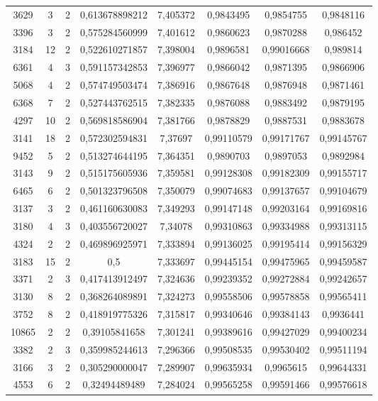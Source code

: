 \begin{longtable}{|c|c|c|c|c|c|c|c|}
3629 & 3 & 2 & 0,613678898212 & 7,405372 & 0,9843495 & 0,9854755 & 0,9848116 \\
3396 & 3 & 2 & 0,575284560999 & 7,401612 & 0,9860623 & 0,9870288 & 0,986452 \\
3184 & 12 & 2 & 0,522610271857 & 7,398004 & 0,9896581 & 0,99016668 & 0,989814 \\
6361 & 4 & 3 & 0,591157342853 & 7,396977 & 0,9866042 & 0,9871395 & 0,9866906 \\
5068 & 4 & 2 & 0,574749503474 & 7,386916 & 0,9867648 & 0,9876948 & 0,9871461 \\
6368 & 7 & 2 & 0,527443762515 & 7,382335 & 0,9876088 & 0,9883492 & 0,9879195 \\
4297 & 10 & 2 & 0,569818586904 & 7,381766 & 0,9878829 & 0,9887531 & 0,9883678 \\
3141 & 18 & 2 & 0,572302594831 & 7,37697 & 0,99110579 & 0,99171767 & 0,99145767 \\
9452 & 5 & 2 & 0,513274644195 & 7,364351 & 0,9890703 & 0,9897053 & 0,9892984 \\
3143 & 9 & 2 & 0,515175605936 & 7,359581 & 0,99128308 & 0,99182309 & 0,99155717 \\
6465 & 6 & 2 & 0,501323796508 & 7,350079 & 0,99074683 & 0,99137657 & 0,99104679 \\
3137 & 3 & 2 & 0,461160630083 & 7,349293 & 0,99147148 & 0,99203164 & 0,99169816 \\
3180 & 4 & 3 & 0,403556720027 & 7,34078 & 0,99310863 & 0,99334988 & 0,99313115 \\
4324 & 2 & 2 & 0,469896925971 & 7,333894 & 0,99136025 & 0,99195414 & 0,99156329 \\
3183 & 15 & 2 & 0,5 & 7,333697 & 0,99445154 & 0,99475965 & 0,99459587 \\
3371 & 2 & 3 & 0,417413912497 & 7,324636 & 0,99239352 & 0,99272884 & 0,99242657 \\
3130 & 8 & 2 & 0,368264089891 & 7,324273 & 0,99558506 & 0,99578858 & 0,99565411 \\
3752 & 8 & 2 & 0,418919775326 & 7,315817 & 0,99340646 & 0,99384143 & 0,9936441 \\
10865 & 2 & 2 & 0,39105841658 & 7,301241 & 0,99389616 & 0,99427029 & 0,99400234 \\
3382 & 2 & 3 & 0,359985244613 & 7,296366 & 0,99508535 & 0,99530402 & 0,99511194 \\
3166 & 3 & 2 & 0,305290000047 & 7,289907 & 0,99635934 & 0,9965615 & 0,99644331 \\
4553 & 6 & 2 & 0,32494489489 & 7,284024 & 0,99565258 & 0,99591466 & 0,99576618 \\

\end{longtable}
